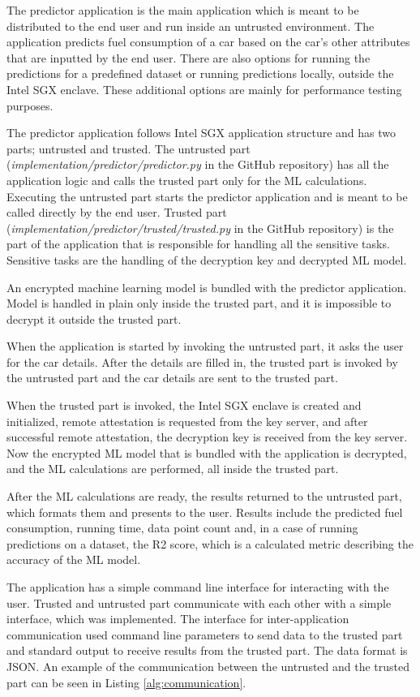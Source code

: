 The predictor application is the main application which is meant to be distributed to the end user and run inside an untrusted environment. The application predicts fuel consumption of a car based on the car's other attributes that are inputted by the end user. There are also options for running the predictions for a predefined dataset or running predictions locally, outside the Intel SGX enclave. These additional options are mainly for performance testing purposes.

The predictor application follows Intel SGX application structure and has two parts; untrusted and trusted. The untrusted part (\textit{implementation/predictor/predictor.py} in the GitHub repository) has all the application logic and calls the trusted part only for the ML calculations. Executing the untrusted part starts the predictor application and is meant to be called directly by the end user. Trusted part (\textit{implementation/predictor/trusted/trusted.py} in the GitHub repository) is the part of the application that is responsible for handling all the sensitive tasks. Sensitive tasks are the handling of the decryption key and decrypted ML model.

An encrypted machine learning model is bundled with the predictor application. Model is handled in plain only inside the trusted part, and it is impossible to decrypt it outside the trusted part.

When the application is started by invoking the untrusted part, it asks the user for the car details. After the details are filled in, the trusted part is invoked by the untrusted part and the car details are sent to the trusted part.

When the trusted part is invoked, the Intel SGX enclave is created and initialized, remote attestation is requested from the key server, and after successful remote attestation, the decryption key is received from the key server. Now the encrypted ML model that is bundled with the application is decrypted, and the ML calculations are performed, all inside the trusted part.

After the ML calculations are ready, the results returned to the untrusted part, which formats them and presents to the user. Results include the predicted fuel consumption, running time, data point count and, in a case of running predictions on a dataset, the R2 score, which is a calculated metric describing the accuracy of the ML model.

The application has a simple command line interface for interacting with the user. Trusted and untrusted part communicate with each other with a simple interface, which was implemented. The interface for inter-application communication used command line parameters to send data to the trusted part and standard output to receive results from the trusted part. The data format is JSON. An example of the communication between the untrusted and the trusted part can be seen in Listing \ref{alg:communication}.

